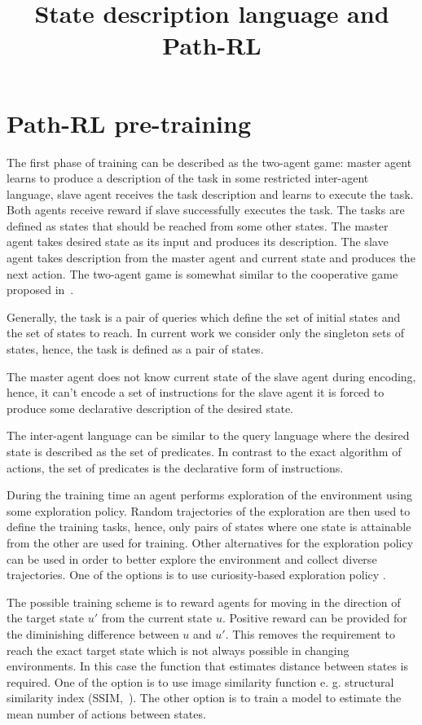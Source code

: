 \documentclass{article}
\title{State description language and Path-RL}
\author{}
\date{}
\begin{document}
\maketitle

\section{Path-RL pre-training}

The first phase of training can be described as the two-agent game: master agent learns to produce a description of the task in some restricted inter-agent language, slave agent receives the task description and learns to execute the task. Both agents receive reward if slave successfully executes the task. The tasks are defined as states that should be reached from some other states. The master agent takes desired state as its input and produces its description. The slave agent takes description from the master agent and current state and produces the next action. The two-agent game is somewhat similar to the cooperative game proposed in~\citep{Mordatch2018EmergenceOG}.

Generally, the task is a pair of queries which define the set of initial states and the set of states to reach. In current work we consider only the singleton sets of states, hence, the task is defined as a pair of states.

The master agent does not know current state of the slave agent during encoding, hence, it can't encode a set of instructions for the slave agent it is forced to produce some declarative description of the desired state.

The inter-agent language can be similar to the query language where the desired state is described as the set of predicates. In contrast to the exact algorithm of actions, the set of predicates is the declarative form of instructions.

During the training time an agent performs exploration of the environment using some exploration policy. Random trajectories of the exploration are then used to define the training tasks, hence, only pairs of states where one state is attainable from the other are used for training. Other alternatives for the exploration policy can be used in order to better explore the environment and collect diverse trajectories. One of the options is to use curiosity-based exploration policy \citep{Pathak2017CuriosityDrivenEB, Burda2019ExplorationBR}.

The possible training scheme is to reward agents for moving in the direction of the target state $u'$ from the current state $u$. Positive reward can be provided for the diminishing difference between $u$ and $u'$. This removes the requirement to reach the exact target state which is not always possible in changing environments. In this case the function that estimates distance between states is required. One of the option is to use image similarity function e. g. structural similarity index (SSIM,~\citep{Wang2004ImageQA}). The other option is to train a model to estimate the mean number of actions between states.
\end{document}
